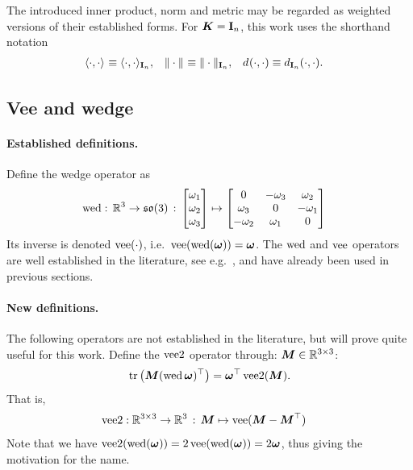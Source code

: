 The introduced inner product, norm and metric may be regarded as weighted versions of their established forms.
For $\mat{K} = \idMat[n]$, this work uses the shorthand notation
\begin{align}
 \sProd[]{\cdot}{\cdot} &\equiv \sProd[{\idMat[n]}]{\cdot}{\cdot},&
 \norm[]{\cdot} &\equiv \norm[{\idMat[n]}]{\cdot},&
 \metric[]{\cdot}{\cdot} &\equiv \metric[{\idMat[n]}]{\cdot}{\cdot}.
\end{align}


\subsection{Vee and wedge}
\paragraph{Established definitions.}
Define the wedge operator as
\begin{subequations}\label{eq:DefWedgeOpSO3}
\begin{align}
 \wedOp : \, \RealNum^3 \rightarrow \SpecialOrthogonalAlgebra(3) \, : \, \begin{bmatrix} \omega_1 \\ \omega_2 \\ \omega_3 \end{bmatrix} &\mapsto \begin{bmatrix} 0 & -\omega_3 & \omega_2 \\ \omega_3 & 0 & -\omega_1 \\ -\omega_2 & \omega_1 & 0 \end{bmatrix}
\end{align}
\end{subequations}
Its inverse is denoted $\veeOp(\cdot)$, i.e.\ $\veeOp(\wedOp(\w)) = \w$.
The $\wedOp$ and $\veeOp$ operators are well established in the literature, see e.g.\ \cite[sec.\ 2.3.2]{Murray:Robotic}, and have already been used in previous sections.

\paragraph{New definitions.}
The following operators are not established in the literature, but will prove quite useful for this work.
Define the $\veeTwoOp$ operator through: $\mat{M}\in\RealNum^{3\times3}$:
\begin{align}\label{eq:EqVeeTwoOpSO3}
 \tr\big( \mat{M} (\wedOp\tuple{\omega})^\top \big) = \tuple{\omega}^\top \veeTwoOp(\mat{M}).
\end{align}
That is,
\begin{align}
 \veeTwoOp &: \RealNum^{3\times 3} \rightarrow \RealNum^3 \, : \, \mat{M} \mapsto \veeOp(\mat{M}-\mat{M}^\top)
\end{align}
Note that we have $\veeTwoOp(\wedOp(\w)) = 2\veeOp(\wedOp(\w)) = 2\w$, thus giving the motivation for the name.

